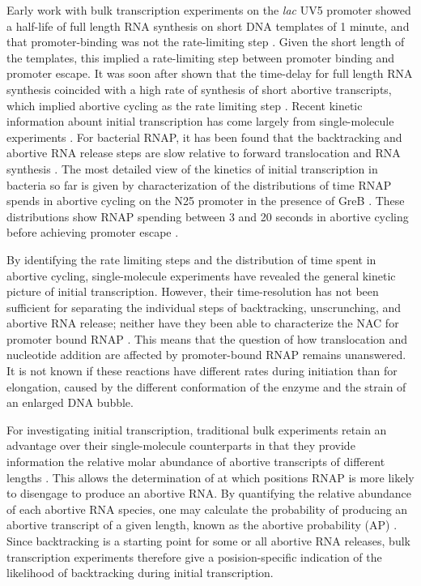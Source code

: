 Early work with bulk transcription experiments on the \textit{lac} UV5
promoter showed a half-life of full length RNA synthesis on short DNA
templates of 1 minute, and that promoter-binding was not the rate-limiting
step \cite{stefano_lac_1979}. Given the short length of the templates, this
implied a rate-limiting step between promoter binding and promoter escape. It
was soon after shown that the time-delay for full length RNA synthesis
coincided with a high rate of synthesis of short abortive transcripts, which
implied abortive cycling as the rate limiting step
\cite{munson_abortive_1981}. Recent kinetic information abount initial
transcription has come largely from single-molecule experiments
\cite{revyakin_abortive_2006, kapanidis_initial_2006, tang_real-time_2009,
kapanidis_retention_2005, margeat_direct_2006}. For bacterial RNAP, it has
been found that the backtracking and abortive RNA release steps are slow
relative to forward translocation and RNA synthesis
\cite{revyakin_abortive_2006, margeat_direct_2006}. The most detailed view of
the kinetics of initial transcription in bacteria so far is given by
characterization of the distributions of time RNAP spends in abortive cycling
on the N25 promoter in the presence of GreB \cite{revyakin_abortive_2006}.
These distributions show RNAP spending between 3 and 20 seconds in abortive
cycling before achieving promoter escape \cite{revyakin_abortive_2006}.

By identifying the rate limiting steps and the distribution of time spent in
abortive cycling, single-molecule experiments have revealed the general
kinetic picture of initial transcription. However, their time-resolution has
not been sufficient for separating the individual steps of backtracking,
unscrunching, and abortive RNA release; neither have they been able to
characterize the NAC for promoter bound RNAP \cite{revyakin_abortive_2006,
margeat_direct_2006}. This means that the question of how translocation and
nucleotide addition are affected by promoter-bound RNAP remains unanswered.
It is not known if these reactions have different rates during initiation than
for elongation, caused by the different conformation of the enzyme and the
strain of an enlarged DNA bubble.

For investigating initial transcription, traditional bulk experiments retain
an advantage over their single-molecule counterparts in that they provide
information the relative molar abundance of abortive transcripts of different
lengths \cite{hsu_monitoring_2009}. This allows the determination of at which
positions RNAP is more likely to disengage to produce an abortive RNA. By
quantifying the relative abundance of each abortive RNA species, one may
calculate the probability of producing an abortive transcript of a given
length, known as the abortive probability (AP) \cite{hsu_promoter_2002,
hsu_quantitative_1996}. Since backtracking is a starting point for some or
all abortive RNA releases, bulk transcription experiments therefore give a
posision-specific indication of the likelihood of backtracking during initial
transcription.

